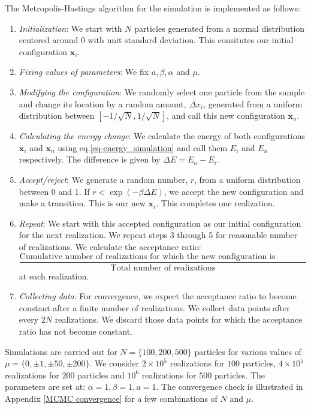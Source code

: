 \documentclass[11pt]{article}
\begin{document}
The Metropolis-Hastings algorithm for the simulation is implemented as follows:
\begin{enumerate}
	\item \emph{Initialization}: We start with $N$ particles generated from a normal distribution centered around 0 with unit standard deviation. This consitutes our initial configuration $\textbf{x}_i$.
	\item \emph{Fixing values of parameters}: We fix $a,\beta,\alpha$ and $\mu$.
	\item \emph{Modifying the configuration}: We randomly select one particle from the sample and change its location by a random amount, $\Delta x_i$, generated from a uniform distribution between $[-1/\sqrt{N},1/\sqrt{N}]$, and call this new configuration $\textbf{x}_n$.
	\item \emph{Calculating the energy change}: We calculate the energy of both configurations $\textbf{x}_i$ and $\textbf{x}_n$ using eq.\eqref{eq-energy_simulation} and call them $E_i$ and $E_n$ respectively. The difference is given by $\Delta E=E_n-E_i$.
	\item \emph{Accept/reject}: We generate a random number, $r$, from a uniform distribution between 0 and 1. If $r<\exp\left(-\beta\Delta E\right)$, we accept the new configuration and make a transition. This is our new $\textbf{x}_i$. This completes one realization. 
	\item \emph{Repeat}: We start with this accepted configuration as our initial configuration for the next realization. We repeat steps 3 through 5 for reasonable number of realizations. We calculate the acceptance ratio:
	$$
		\frac{\textrm{Cumulative number of realizations for which the new configuration is accepted}}{\textrm{Total number of realizations}}
	$$
	at each realization.
	\item \emph{Collecting data}: For convergence, we expect the acceptance ratio to become constant after a finite number of realizations. We collect data points after every $2N$ realizations. We discard those data points for which the acceptance ratio has not become constant.
\end{enumerate}
Simulations are carried out for $N=\{100,200,500\}$ particles for various values of $\mu=\{0,\pm 1,\pm 50,\pm 200\}$. We consider $2\times 10^5$ realizations for $100$ particles, $4\times 10^5$ realizations for $200$ particles and $10^6$ realizations for $500$ particles. The parameters are set at: $\alpha=1,\beta=1,a=1$. The convergence check is illustrated in Appendix \ref{MCMC convergence} for a few combinations of $N$ and $\mu$.
\end{document}
